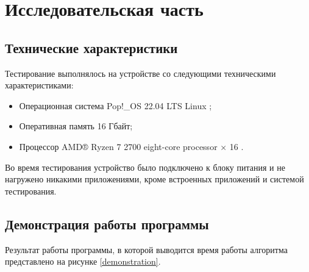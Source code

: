 \chapter{Исследовательская часть}
\section{Технические характеристики}
Тестирование выполнялось на устройстве со следующими техническими характеристиками:
\begin{itemize}
	\item Операционная система Pop!\_OS 22.04 LTS \cite{ubuntu} Linux \cite{linux};
	\item Оперативная память 16 Гбайт;
	\item Процессор AMD® Ryzen 7 2700 eight-core processor × 16 \cite{amd}.
\end{itemize}

Во время тестирования устройство было подключено к блоку питания и не нагружено никакими приложениями, кроме встроенных приложений и системой тестирования.

\section{Демонстрация работы программы}



Результат работы программы, в которой выводится время работы алгоритма представлено на рисунке \ref{demonstration}.

